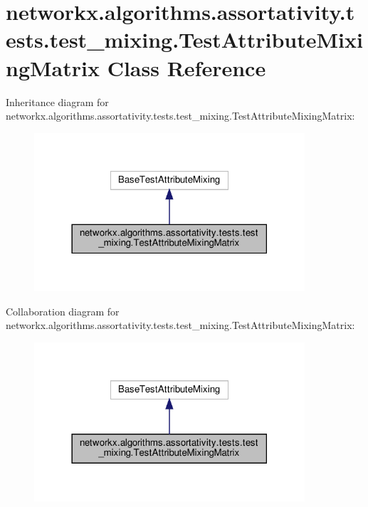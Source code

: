 \hypertarget{classnetworkx_1_1algorithms_1_1assortativity_1_1tests_1_1test__mixing_1_1TestAttributeMixingMatrix}{}\section{networkx.\+algorithms.\+assortativity.\+tests.\+test\+\_\+mixing.\+Test\+Attribute\+Mixing\+Matrix Class Reference}
\label{classnetworkx_1_1algorithms_1_1assortativity_1_1tests_1_1test__mixing_1_1TestAttributeMixingMatrix}


Inheritance diagram for networkx.\+algorithms.\+assortativity.\+tests.\+test\+\_\+mixing.\+Test\+Attribute\+Mixing\+Matrix\+:
\nopagebreak
\begin{figure}[H]
\begin{center}
\leavevmode
\includegraphics[width=285pt]{classnetworkx_1_1algorithms_1_1assortativity_1_1tests_1_1test__mixing_1_1TestAttributeMixingMatrix__inherit__graph}
\end{center}
\end{figure}


Collaboration diagram for networkx.\+algorithms.\+assortativity.\+tests.\+test\+\_\+mixing.\+Test\+Attribute\+Mixing\+Matrix\+:
\nopagebreak
\begin{figure}[H]
\begin{center}
\leavevmode
\includegraphics[width=285pt]{classnetworkx_1_1algorithms_1_1assortativity_1_1tests_1_1test__mixing_1_1TestAttributeMixingMatrix__coll__graph}
\end{center}
\end{figure}
